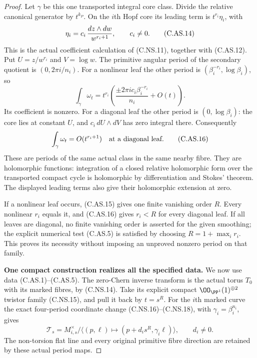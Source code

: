 \begin{proof}
Let $\gamma$ be this one transported
integral core class. Divide the relative
canonical generator by $t^{k_P}$.
On the $i$th Hopf core its leading
term is $t^{r_i}\eta_i$, with
\[
                   \eta_i=c_i\,{dz\wedge dw\over w^{r_i+1}},
                          \qquad c_i\ne0.               \tag{C.AS.14}
\]
This is the actual coefficient calculation
of (C.NS.11), together with (C.AS.12).
Put $U=z/w^{r_i}$ and $V=\log w$.
The primitive angular period of the
secondary quotient is $(0,2\pi i/n_i)$.
For a nonlinear leaf the other period is
$(\beta_i^{-r_i},\log\beta_i)$, so
\[
       \int_{\gamma}\omega_t
          =t^{r_i}\left(\frac{\pm2\pi i c_i\beta_i^{-r_i}}{n_i}
                         +O(t)\right).                 \tag{C.AS.15}
\]
Its coefficient is nonzero. For a diagonal
leaf the other period is
$(0,\log\beta_i)$: the core lies at
constant $U$, and $c_i\,dU\wedge dV$
has zero integral there. Consequently
\[
                         \int_\gamma\omega_t=O(t^{r_i+1})
                  \quad\hbox{at a diagonal leaf}.        \tag{C.AS.16}
\]
These are periods of the same actual
class in the same nearby fibre. They
are holomorphic functions: integration
of a closed relative holomorphic form
over the transported compact cycle is
holomorphic by differentiation and
Stokes' theorem. The displayed leading
terms also give their holomorphic
extension at zero.

If a nonlinear leaf occurs, (C.AS.15)
gives one finite vanishing order $R$.
Every nonlinear $r_i$ equals it, and
(C.AS.16) gives $r_i<R$ for every
diagonal leaf. If all leaves are
diagonal, no finite vanishing order
is asserted for the given smoothing;
the explicit numerical test (C.AS.5)
is satisfied by choosing
$R=1+\max_i r_i$. This proves its
necessity without imposing an unproved
nonzero period on that family.

\par\medskip\noindent\textbf{One compact construction realizes all the specified data.}
We now use data (C.AS.1)--(C.AS.5).
The zero-Chern inverse transform is
the actual torus $T_0$ with its marked
fibres, by (C.NS.14). Take its explicit
compact $\OO_{\PP^1}(1)^{\oplus2}$
twistor family (C.NS.15), and pull it
back by $t=s^R$. For the $i$th marked
curve the exact four-period coordinate
change (C.NS.16)--(C.NS.18), with
$\gamma_i=\beta_i^{n_i}$, gives
\[
 \mathcal T_s=M_{i,s}^{\times}/
   \langle(p,\ell)\mapsto(p+d_i s^R,\gamma_i\ell)\rangle,
                    \qquad d_i\ne0 .                  \tag{C.AS.17}
\]
The non-torsion flat line and every
original primitive fibre direction
are retained by these actual period
maps.


\end{proof}
